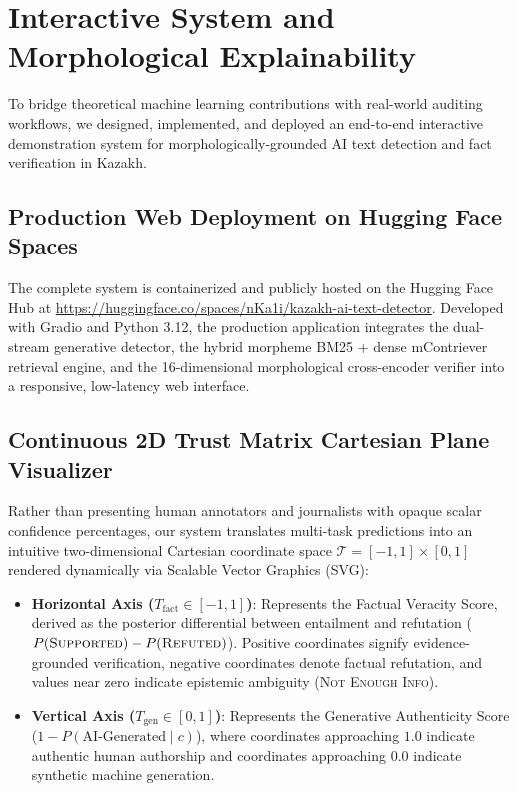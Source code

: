 \section{Interactive System and Morphological Explainability}
\label{sec:system_and_explainability}

To bridge theoretical machine learning contributions with real-world auditing workflows, we designed, implemented, and deployed an end-to-end interactive demonstration system for morphologically-grounded AI text detection and fact verification in Kazakh.

\subsection{Production Web Deployment on Hugging Face Spaces}
The complete system is containerized and publicly hosted on the Hugging Face Hub at \url{https://huggingface.co/spaces/nKa1i/kazakh-ai-text-detector}. Developed with Gradio and Python 3.12, the production application integrates the dual-stream generative detector, the hybrid morpheme BM25 + dense mContriever retrieval engine, and the 16-dimensional morphological cross-encoder verifier into a responsive, low-latency web interface.

\subsection{Continuous 2D Trust Matrix Cartesian Plane Visualizer}
Rather than presenting human annotators and journalists with opaque scalar confidence percentages, our system translates multi-task predictions into an intuitive two-dimensional Cartesian coordinate space $\mathcal{T} = [-1, 1] \times [0, 1]$ rendered dynamically via Scalable Vector Graphics (SVG):
\begin{itemize}
    \item \textbf{Horizontal Axis ($T_{\text{fact}} \in [-1, 1]$)}: Represents the Factual Veracity Score, derived as the posterior differential between entailment and refutation ($P(\textsc{Supported}) - P(\textsc{Refuted})$). Positive coordinates signify evidence-grounded verification, negative coordinates denote factual refutation, and values near zero indicate epistemic ambiguity (\textsc{Not Enough Info}).
    \item \textbf{Vertical Axis ($T_{\text{gen}} \in [0, 1]$)}: Represents the Generative Authenticity Score ($1 - P(\text{AI-Generated} \mid c)$), where coordinates approaching $1.0$ indicate authentic human authorship and coordinates approaching $0.0$ indicate synthetic machine generation.
\end{itemize}

